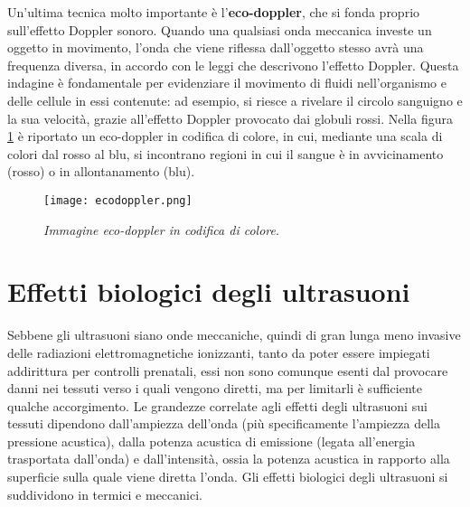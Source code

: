 \documentclass{report}
\newcommand{\figref}[1]{figura \ref{#1}}
\numberwithin{equation}{section}
\numberwithin{figure}{section}
\begin{document}
Un'ultima tecnica molto importante è l'\textbf{eco-doppler}, che si fonda proprio sull'effetto Doppler sonoro. Quando una qualsiasi onda meccanica investe un oggetto in movimento, l'onda che viene riflessa dall'oggetto stesso avrà una frequenza diversa, in accordo con le leggi che descrivono l'effetto Doppler. Questa indagine è fondamentale per evidenziare il movimento di fluidi nell'organismo e delle cellule in essi contenute: ad esempio, si riesce a rivelare il circolo sanguigno e la sua velocità, grazie all'effetto Doppler provocato dai globuli rossi. Nella \figref{fig:ecodoppler} è riportato un eco-doppler in codifica di colore, in cui, mediante una scala di colori dal rosso al blu, si incontrano regioni in cui il sangue è in avvicinamento (rosso) o in allontanamento (blu).

\begin{figure}[htp]
\centering
\texttt{[image: ecodoppler.png]}
\caption{\label{fig:ecodoppler} \textit{Immagine eco-doppler in codifica di colore}.}
\end{figure}

\section{Effetti biologici degli ultrasuoni}
Sebbene gli ultrasuoni siano onde meccaniche, quindi di gran lunga meno invasive delle radiazioni elettromagnetiche ionizzanti, tanto da poter essere impiegati addirittura per controlli prenatali, essi non sono comunque esenti dal provocare danni nei tessuti verso i quali vengono diretti, ma per limitarli è sufficiente qualche accorgimento. Le grandezze correlate agli effetti degli ultrasuoni sui tessuti dipendono dall'ampiezza dell'onda (più specificamente l'ampiezza della pressione acustica), dalla potenza acustica di emissione (legata all'energia trasportata dall'onda) e dall'intensità, ossia la potenza acustica in rapporto alla superficie sulla quale viene diretta l'onda. Gli effetti biologici degli ultrasuoni si suddividono in termici e meccanici.
\end{document}
